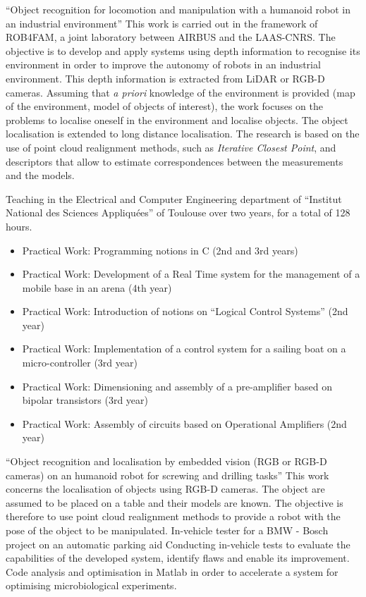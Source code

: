 \documentclass[11pt,a4paper,sans]{moderncv}         %
\begin{document}
{``Object recognition for locomotion and manipulation with a humanoid robot in an industrial environment''}
{
This work is carried out in the framework of ROB4FAM, a joint laboratory between AIRBUS and the LAAS-CNRS.
The objective is to develop and apply systems using depth information to recognise its environment in order to improve the autonomy of robots in an industrial environment.
This depth information is extracted from LiDAR or RGB-D cameras.
Assuming that \emph{a priori} knowledge of the environment is provided (map of the environment, model of objects of interest), the work focuses on the problems to localise oneself in the environment and localise objects.
The object localisation is extended to long distance localisation.
The research is based on the use of point cloud realignment methods, such as \emph{Iterative Closest Point}, and descriptors that allow to estimate correspondences between the measurements and the models.
}
%
{}{
  Teaching in the Electrical and Computer Engineering department of ``Institut National des Sciences Appliqu\'ees'' of Toulouse over two years, for a total of 128 hours.
  \begin{itemize}
    \item Practical Work: Programming notions in C (2nd and 3rd years)
    \item Practical Work: Development of a Real Time system for the management of a mobile base in an arena (4th year)
    \item Practical Work: Introduction of notions on ``Logical Control Systems'' (2nd year)
    \item Practical Work: Implementation of a control system for a sailing boat on a micro-controller (3rd year)
    \item Practical Work: Dimensioning and assembly of a pre-amplifier based on bipolar transistors (3rd year)
    \item Practical Work: Assembly of circuits based on Operational Amplifiers (2nd year)
  \end{itemize}
}
%
{``Object recognition and localisation by embedded vision (RGB or RGB-D cameras) on an humanoid robot for screwing and drilling tasks''}{
This work concerns the localisation of objects using RGB-D cameras.
The object are assumed to be placed on a table and their models are known.
The objective is therefore to use point cloud realignment methods to provide a robot with the pose of the object to be manipulated.
}
%
{In-vehicle tester for a BMW - Bosch project on an automatic parking aid}{
  Conducting in-vehicle tests to evaluate the capabilities of the developed system, identify flaws and enable its improvement.
}
%
{Code analysis and optimisation in Matlab in order to accelerate a system for optimising microbiological experiments.
}
\end{document}
